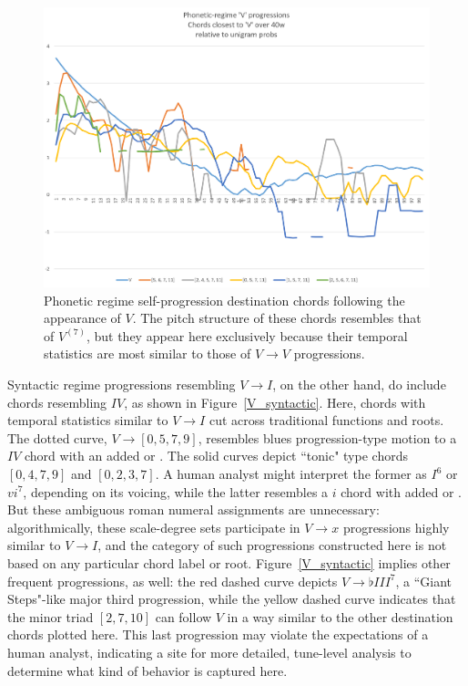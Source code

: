 \begin{figure}[h]
	\caption{Phonetic regime self-progression destination chords following the appearance of $V$.  The pitch structure of these chords resembles that of $V^{(7)}$, but they appear here exclusively because their temporal statistics are most similar to those of $V \rightarrow V$ progressions.}
	\label{V_phonetic}
	\centering
	\includegraphics[width=6in]{V_phonetic.png}
\end{figure}

Syntactic regime progressions resembling $V \rightarrow I$, on the other hand, do include chords resembling $IV$, as shown in Figure~\ref{V_syntactic}.  Here, chords with temporal statistics similar to $V \rightarrow I$ cut across traditional functions and roots.  The dotted curve, $V \rightarrow [0,5,7,9]$, resembles blues progression-type motion to a $IV$ chord with an added  or .  The solid curves depict ``tonic" type chords $[0,4,7,9]$ and $[0,2,3,7]$.  A human analyst might interpret the former as $I^6$ or $vi^7$, depending on its voicing, while the latter resembles a $i$ chord with added  or .  But these ambiguous roman numeral assignments are unnecessary: algorithmically, these scale-degree sets participate in $V \rightarrow x$ progressions highly similar to $V \rightarrow I$, and the category of such progressions constructed here is not based on any particular chord label or root.  Figure~\ref{V_syntactic} implies other frequent progressions, as well: the red dashed curve depicts $V \rightarrow \flat III^7$, a ``Giant Steps"-like major third progression, while the yellow dashed curve indicates that the minor triad $[2,7,10]$ can follow $V$ in a way similar to the other destination chords plotted here.  This last progression may violate the expectations of a human analyst, indicating a site for more detailed, tune-level analysis to determine what kind of behavior is captured here.

